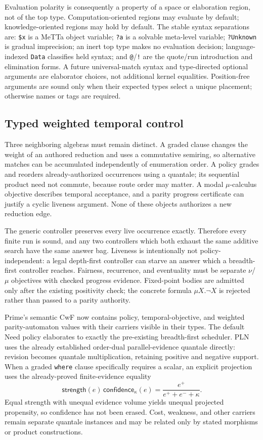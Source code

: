 \documentclass[11pt]{article}
\newcommand{\code}[1]{\texttt{#1}}
\begin{document}
Evaluation polarity is consequently a property of a space or elaboration
region, not of the top type.  Computation-oriented regions may evaluate by
default; knowledge-oriented regions may hold by default.  The stable syntax
separations are: \code{\$x} is a MeTTa object variable; \code{?a} is a solvable
meta-level variable; \code{?Unknown} is gradual
imprecision; an inert top type makes no evaluation decision; language-indexed
\code{Data} classifies held syntax; and \code{@}/\code{!} are the quote/run
introduction and elimination forms.  A future universal-match syntax and
type-directed optional arguments are elaborator choices, not additional kernel
equalities.  Position-free arguments are sound only when their expected types
select a unique placement; otherwise names or tags are required.

\subsection{Typed weighted temporal control}

Three neighboring algebras must remain distinct.  A graded clause changes the
weight of an authored reduction and uses a commutative semiring, so alternative
matches can be accumulated independently of enumeration order.  A policy grades
and reorders already-authorized occurrences using a quantale; its sequential
product need not commute, because route order may matter.  A modal
$\mu$-calculus objective describes temporal acceptance, and a parity progress
certificate can justify a cyclic liveness argument.  None of these objects
authorizes a new reduction edge.

The generic controller preserves every live occurrence exactly.  Therefore
every finite run is sound, and any two controllers which both exhaust the same
additive search have the same answer bag.  Liveness is intentionally not
policy-independent: a legal depth-first controller can starve an answer which a
breadth-first controller reaches.  Fairness, recurrence, and eventuality must be
separate $\nu$/$\mu$ objectives with checked progress evidence.  Fixed-point
bodies are admitted only after the existing positivity check; the concrete
formula $\mu X.\neg X$ is rejected rather than passed to a parity authority.

Prime's semantic CwF now contains policy, temporal-objective, and weighted
parity-automaton values with their carriers visible in their types.  The default
Need policy elaborates to exactly the pre-existing breadth-first scheduler.
PLN uses the already established order-dual parallel-evidence quantale directly:
revision becomes quantale multiplication, retaining positive and negative
support.  When a graded \code{where} clause specifically requires a scalar, an
explicit projection uses the already-proved finite-evidence equality
\[
  \mathsf{strength}(e)\,\mathsf{confidence}_{\kappa}(e)
    = \frac{e^+}{e^+ + e^- + \kappa}.
\]
Equal strength with unequal evidence volume yields unequal projected propensity,
so confidence has not been erased.  Cost, weakness, and other carriers remain
separate quantale instances and may be related only by stated morphisms or
product constructions.
\end{document}
